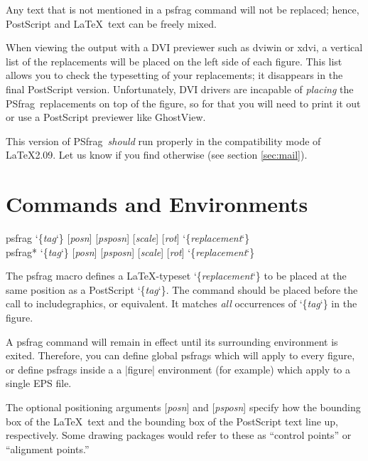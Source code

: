 \documentclass[11pt]{ltxguide}
\let\pkg\textsf
\newcommand{\pfg}{\pkg{PSfrag}}
\def\cs#1{%
  {\ttfamily\expandafter\string\csname #1\endcsname}}
\providecommand\marg[1]{%
  {\ttfamily\char`\{}{\em#1\/}{\ttfamily\char`\}}}
\providecommand\oarg[1]{%
  {\ttfamily[}{\em #1\/}{\ttfamily]}}
\begin{document}
Any text that is not mentioned in a \cs{psfrag} command
will not be replaced; hence, PostScript and \LaTeX\
text can be freely mixed.

When viewing the output with a DVI previewer such as \pkg{dviwin} or
\pkg{xdvi}, a vertical list of the replacements will be placed on the
left side of each figure. This list allows you to check the
typesetting of your replacements; it disappears in the final
PostScript version. Unfortunately, DVI drivers are incapable of
\emph{placing} the \pfg\ replacements on top of the figure, so
for that you will need to print it out or use a PostScript
previewer like GhostView.

This version of \pfg\ \emph{should} run properly in the compatibility
mode of \LaTeX2.09. Let us know if you find otherwise (see section
\ref{sec:mail}).

\section{Commands and Environments}\label{sec:pos}

\begin{decl}
\cs{psfrag}\marg{tag}\oarg{posn}\oarg{psposn}%
        \oarg{scale}\oarg{rot}\marg{replacement}\\
\cs{psfrag*}\marg{tag}\oarg{posn}\oarg{psposn}%
        \oarg{scale}\oarg{rot}\marg{replacement}
\end{decl}

The \cs{psfrag} macro defines a \LaTeX-typeset \marg{replacement} to be placed
at the same position as a PostScript \marg{tag}. The command should be placed
before the call to \cs{includegraphics}, or equivalent. It matches \emph{all}
occurrences of \marg{tag} in the figure.

A \cs{psfrag} command will remain in effect until its surrounding environment
is exited. Therefore, you can define global \cs{psfrag}s which will apply to
every figure, or define \cs{psfrag}s inside a a |figure| environment (for
example) which apply to a single EPS file.

The optional positioning arguments \oarg{posn} and \oarg{psposn} specify how
the bounding box of the \LaTeX\ text and the bounding box of the PostScript
text line up, respectively. Some drawing packages would refer to these as
``control points'' or ``alignment points.''
\end{document}
